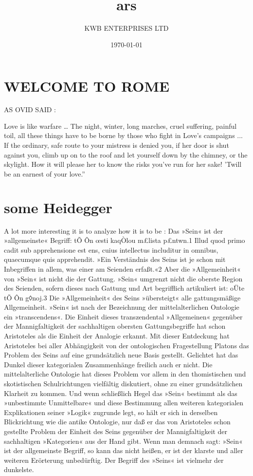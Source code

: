 \documentclass[11pt, a4paper, twocolumn]{IEEEtran}
\title{ars}
\author{KWB ENTERPRISES LTD}
\date{\today}
\begin{document}
\maketitle
\section{WELCOME TO ROME}
AS OVID SAID \cite{ArsArmatoria}: 

Love is like warfare … The night, winter, long marches, cruel suffering, painful toil, all these things have to be borne by those who fight in Love's campaigns ... If the ordinary, safe route to your mistress is denied you, if her door is shut against you, climb up on to the roof and let yourself down by the chimney, or the skylight. How it will please her to know the risks you've run for her sake! 'Twill be an earnest of your love.” 
\section{some Heidegger}
A lot more interesting it is to analyze how it is to be \cite{SeinZeit}:
 Das »Sein« ist der »allgemeinste« Begriff: tÕ Ôn œsti kaqÒlou
m£lista p£ntwn.1 Illud quod primo cadit sub apprehensione est
ens, cuius intellectus includitur in omnibus, quaecumque quis
apprehendit. »Ein Verständnis des Seins ist je schon mit Inbegriffen
in allem, was einer am Seienden erfaßt.«2 Aber die
»Allgemeinheit« von »Sein« ist nicht die der Gattung. »Sein«
umgrenzt nicht die oberste Region des Seienden, sofern dieses
nach Gattung und Art begrifflich artikuliert ist: oÜte tÕ Ôn g◊noj.3
Die »Allgemeinheit« des Seins »übersteigt« alle gattungsmäßige
Allgemeinheit. »Sein« ist nach der Bezeichnung der mittelalterlichen
Ontologie ein »transcendens«. Die Einheit dieses transzendental
»Allgemeinen« gegenüber der Mannigfaltigkeit der sachhaltigen
obersten Gattungsbegriffe hat schon Aristoteles als die
Einheit der Analogie erkannt. Mit dieser Entdeckung hat Aristoteles
bei aller Abhängigkeit von der ontologischen Fragestellung
Platons das Problem des Seins auf eine grundsätzlich neue Basis
gestellt. Gelichtet hat das Dunkel dieser kategorialen Zusammenhänge
freilich auch er nicht. Die mittelalterliche Ontologie hat
dieses Problem vor allem in den thomistischen und skotistischen
Schulrichtungen vielfältig diskutiert, ohne zu einer grundsätzlichen
Klarheit zu kommen. Und wenn schließlich Hegel das
»Sein« bestimmt als das »unbestimmte Unmittelbare« und diese
Bestimmung allen weiteren kategorialen Explikationen seiner
»Logik« zugrunde legt, so hält er sich in derselben Blickrichtung
wie die antike Ontologie, nur daß er das von Aristoteles schon
gestellte Problem der Einheit des Seins gegenüber der Mannigfaltigkeit
der sachhaltigen »Kategorien« aus der Hand gibt. Wenn
man demnach sagt: »Sein« ist der allgemeinste Begriff, so kann
das nicht heißen, er ist der klarste und aller weiteren Erörterung
unbedürftig. Der Begriff des »Seins« ist vielmehr der dunkelste.
\end{document}

